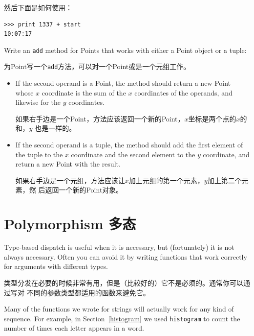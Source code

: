\documentclass[10pt]{book}
\begin{document}
\begin{CJK}{UTF8}{gbsn}
然后下面是如何使用：

\begin{verbatim}
>>> print 1337 + start
10:07:17
\end{verbatim}
%

\begin{exercise}

Write an {\tt add} method for Points that works with either a
Point object or a tuple:  

为Point写一个{\tt add}方法，可以对一个Point或是一个元组工作。

\begin{itemize}

\item If the second operand is a Point, the method should return a new
Point whose $x$ coordinate is the sum of the $x$ coordinates of the
operands, and likewise for the $y$ coordinates.

如果右手边是一个Point，方法应该返回一个新的Point，$x$坐标是两个点的$x$的和，$y$
也是一样的。

\item If the second operand is a tuple, the method should add the
first element of the tuple to the $x$ coordinate and the second
element to the $y$ coordinate, and return a new Point with the result. 

如果右手边是一个元组，方法应该让$x$加上元组的第一个元素，$y$加上第二个元素，然
后返回一个新的Point对象。

\end{itemize}

\end{exercise}

\section{Polymorphism 多态}

Type-based dispatch is useful when it is necessary, but (fortunately)
it is not always necessary.  Often you can avoid it by writing functions
that work correctly for arguments with different types.

类型分发在必要的时候非常有用，但是（比较好的）它不是必须的。通常你可以通过写对
不同的参数类型都适用的函数来避免它。

Many of the functions we wrote for strings will actually
work for any kind of sequence.
For example, in Section~\ref{histogram}
we used {\tt histogram} to count the number of times each letter
appears in a word.


\end{CJK}
\end{document}
